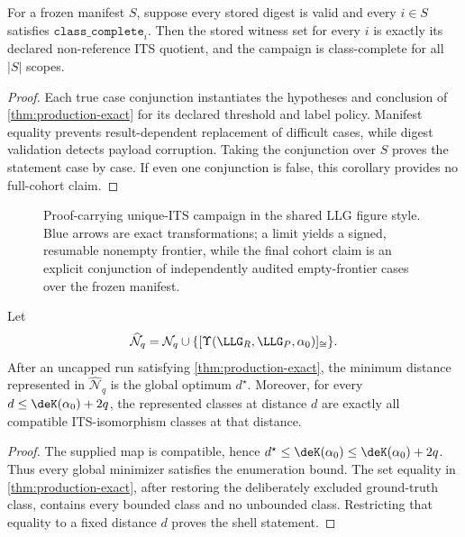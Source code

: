 \begin{corollary}
\label{cor:cohort-certificate}
For a frozen manifest $S$, suppose every stored digest is valid and every
$i\in S$ satisfies $\texttt{class\_complete}_i$.  Then the stored witness set
for every $i$ is exactly its declared non-reference ITS quotient, and the
campaign is class-complete for all $|S|$ scopes.
\end{corollary}

\begin{proof}
Each true case conjunction instantiates the hypotheses and conclusion of
\cref{thm:production-exact} for its declared threshold and label policy.
Manifest equality prevents result-dependent replacement of difficult cases,
while digest validation detects payload corruption.  Taking the conjunction
over $S$ proves the statement case by case.  If even one conjunction is
false, this corollary provides no full-cohort claim.
\end{proof}

\begin{figure}[t]
\centering

\caption{Proof-carrying unique-ITS campaign in the shared LLG figure style.
Blue arrows are exact transformations; a limit yields a signed, resumable
nonempty frontier, while the final cohort claim is an explicit conjunction of
independently audited empty-frontier cases over the frozen manifest.}
\label{fig:certificate-pipeline}
\end{figure}

\begin{corollary}
\label{cor:optimal-shell-certificate}
Let
\[
  \widehat{\mathcal N}_q
  =
  \mathcal N_q
  \cup\{[\Upsilon(\LLG_R,\LLG_P,\alpha_0)]_{\cong}\}.
\]
After an uncapped run satisfying \cref{thm:production-exact}, the minimum
distance represented in \(\widehat{\mathcal N}_q\) is the global optimum
\(d^\star\).  Moreover, for every
\(d\le \deK(\alpha_0)+2q\), the represented
classes at distance $d$ are exactly all compatible ITS-isomorphism classes at
that distance.
\end{corollary}

\begin{proof}
The supplied map is compatible, hence
\(d^\star\le \deK(\alpha_0)\le \deK(\alpha_0)+2q\).  Thus every global
minimizer satisfies the enumeration bound.  The set equality in
\cref{thm:production-exact}, after restoring the deliberately excluded
ground-truth class, contains every bounded class and no unbounded class.
Restricting that equality to a fixed distance $d$ proves the shell statement.
\end{proof}

